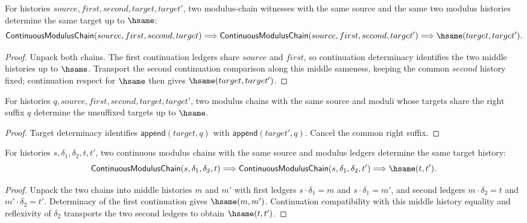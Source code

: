 \begin{theorem}
\label{thm:continuous-modulus-chain-target-deterministic}
For histories $source,first,second,target,target'$, two modulus-chain witnesses
with the same source and the same two modulus histories determine the same
target up to $\hsame$:
$$
\mathsf{ContinuousModulusChain}(source,first,second,target)
\Longrightarrow
\mathsf{ContinuousModulusChain}(source,first,second,target')
\Longrightarrow
\hsame(target,target').
$$
\end{theorem}
\begin{proof}
Unpack both chains. The first continuation ledgers share $source$ and $first$,
so continuation determinacy identifies the two middle histories up to
$\hsame$. Transport the second continuation comparison along this middle
sameness, keeping the common $second$ history fixed; continuation respect for
$\hsame$ then gives $\hsame(target,target')$.
\end{proof}

\begin{theorem}
\label{thm:continuous-modulus-chain-append-suffix-target-deterministic}
For histories $q,source,first,second,target,target'$, two modulus chains with
the same source and moduli whose targets share the right suffix $q$ determine
the unsuffixed targets up to $\hsame$.
\end{theorem}
\begin{proof}
Target determinacy identifies $\mathsf{append}(target,q)$ with
$\mathsf{append}(target',q)$. Cancel the common right suffix.
\end{proof}

\begin{theorem}
\label{thm:continuous-modulus-chain-result-deterministic}
For histories $s,\delta_1,\delta_2,t,t'$, two continuous modulus chains with the
same source and modulus ledgers determine the same target history:
$$
\mathsf{ContinuousModulusChain}(s,\delta_1,\delta_2,t)
\Longrightarrow
\mathsf{ContinuousModulusChain}(s,\delta_1,\delta_2,t')
\Longrightarrow
\hsame(t,t').
$$
\end{theorem}
\begin{proof}
Unpack the two chains into middle histories $m$ and $m'$ with first ledgers
$s\cdot\delta_1=m$ and $s\cdot\delta_1=m'$, and second ledgers
$m\cdot\delta_2=t$ and $m'\cdot\delta_2=t'$. Determinacy of the first
continuation gives $\hsame(m,m')$. Continuation compatibility with this middle
history equality and reflexivity of $\delta_2$ transports the two second ledgers
to obtain $\hsame(t,t')$.
\end{proof}

